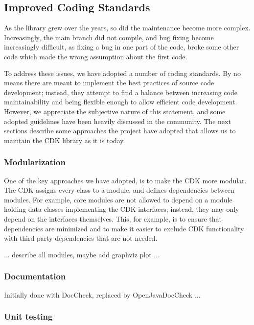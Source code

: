 \documentclass[10pt]{bmc_article}
\newenvironment{bmcformat}{\begin{raggedright}\baselineskip20pt\sloppy\setboolean{publ}{false}}{\end{raggedright}\baselineskip20pt\sloppy}
\begin{document}
\begin{bmcformat}
\subsection*{Improved Coding Standards}

As the library grew over the years, so did the maintenance become more complex. Increasingly,
the main branch did not compile, and bug fixing become increasingly difficult, as fixing a bug
in one part of the code, broke some other code which made the wrong assumption about the first
code.

To address these issues, we have adopted a number of coding standards. By no means there are
meant to implement the best practices of source code development; instead, they attempt to find
a balance between increasing code maintainability and being flexible enough to allow efficient
code development. However, we appreciate the subjective nature of this statement, and some
adopted guidelines have been heavily discussed in the community.
The next sections describe some approaches the project have adopted that allows us to
maintain the CDK library as it is today. 

  \subsubsection*{Modularization}
  
One of the key approaches we have adopted, is to make the CDK more modular. The CDK assigns
every class to a module, and defines dependencies between modules. For example, core modules
are not allowed to depend on a module holding data classes implementing the CDK interfaces;
instead, they may only depend on the interfaces themselves. This, for example, is to ensure
that dependencies are minimized and to make it easier to exclude CDK functionality with
third-party dependencies that are not needed.

... describe all modules, maybe add graphviz plot ...




  \subsubsection*{Documentation}

  Initially done with DocCheck, replaced by OpenJavaDocCheck ...
  
  \subsubsection*{Unit testing}
  

\end{bmcformat}
\end{document}
